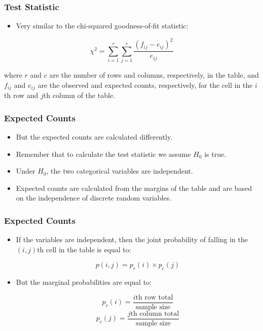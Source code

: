 \documentclass[12pt]{beamer}
\begin{document}
\begin{frame}
	\frametitle{Test Statistic}
	
	\begin{itemize}[label={\color{blue}$\blacktriangleright$}]
		\item Very similar to the chi-squared goodness-of-fit statistic:
	\end{itemize}
	
	\medskip
	
	\[
	\chi^2 = \sum_{i=1}^r \sum_{j=1}^c \frac{(f_{ij} - e_{ij})^2}{e_{ij}}
	\]
	
	\medskip
	
	where $r$ and $c$ are the number of rows and columns, respectively, in the table, and $f_{ij}$ and $e_{ij}$ are the observed and expected counts, respectively, for the cell in the $i$th row and $j$th column of the table.
	
\end{frame}
\begin{frame}
	\frametitle{Expected Counts}
	
	\begin{itemize}[label={\color{blue}$\blacktriangleright$}]
		\item But the expected counts are calculated differently.
		
		\item Remember that to calculate the test statistic we assume $H_0$ is true.
		
		\item Under $H_0$, the two categorical variables are independent.
		
		\item Expected counts are calculated from the margins of the table and are based on the independence of discrete random variables.
	\end{itemize}
	
\end{frame}
\begin{frame}
	\frametitle{Expected Counts}
	
	\begin{itemize}[label={\color{blue}$\blacktriangleright$}]
		\item If the variables are independent, then the joint probability of falling in the $(i, j)$th cell in the table is equal to:
		
		\medskip
		\[
		p(i,j) = p_r(i) \times p_c(j)
		\]
		
		\item But the marginal probabilities are equal to:
		
		\medskip
		\[
		p_r(i) = \frac{\text{$i$th row total}}{\text{sample size}}
		\]
		\[
		p_c(j) = \frac{\text{$j$th column total}}{\text{sample size}}
		\]
	\end{itemize}
	
\end{frame}
\end{document}
